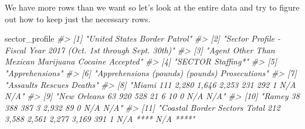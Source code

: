 \documentclass[
  12pt,
]{book}
\newenvironment{Shaded}{\begin{snugshade}}{\end{snugshade}}
\newcommand{\CommentTok}[1]{\textcolor[rgb]{0.37,0.37,0.37}{\textit{#1}}}
\newcommand{\NormalTok}[1]{#1}
\begin{document}
We have more rows than we want so let's look at the entire data and try to figure out how to keep just the necessary rows.

\begin{Shaded}
\begin{Highlighting}[]
\NormalTok{sector\_profile}
\CommentTok{\#>  [1] "United States Border Patrol"                                                                                                                                                                         }
\CommentTok{\#>  [2] "Sector Profile {-} Fiscal Year 2017 (Oct. 1st through Sept. 30th)"                                                                                                                                     }
\CommentTok{\#>  [3] "Agent                              Other Than Mexican           Marijuana          Cocaine         Accepted"                                                                                         }
\CommentTok{\#>  [4] "SECTOR                            Staffing*"                                                                                                                                                         }
\CommentTok{\#>  [5] "Apprehensions"                                                                                                                                                                                       }
\CommentTok{\#>  [6] "Apprehensions                (pounds)          (pounds)    Prosecutions"                                                                                                                             }
\CommentTok{\#>  [7] "Assaults Rescues       Deaths"                                                                                                                                                                       }
\CommentTok{\#>  [8] "Miami                                             111               2,280                    1,646                   2,253             231              292               1           N/A     N/A"   }
\CommentTok{\#>  [9] "New Orleans                                        63                920                      528                      21                6               10               0           N/A     N/A"   }
\CommentTok{\#> [10] "Ramey                                              38                388                      387                       3             2,932              89               0           N/A     N/A"   }
\CommentTok{\#> [11] "Coastal Border Sectors Total                      212               3,588                    2,561                   2,277            3,169             391               1        N/A **** N/A ****"}

\end{Highlighting}
\end{Shaded}
\end{document}
